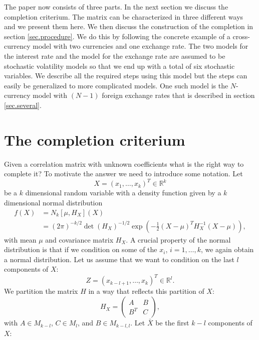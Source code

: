 \documentclass[11pt, a4paper]{article}
\newcommand{\R}{\mathbb{R}}
\begin{document}
The paper now consists of three parts. In the next section we discuss the completion criterium. The matrix can be characterized in three different ways and we present them here. We then discuss the construction of the completion in section \ref{sec.procedure}. We do this by following the concrete example of a cross-currency model with two currencies and one exchange rate. The two models for the interest rate and the model for the exchange rate are assumed to be stochastic volatility models so that we end up with a total of six stochastic variables. We describe all the required steps using this model but the steps can easily be generalized to more complicated models. One such model is the $N$-currency model with $(N-1)$ foreign exchange rates that is described in section \ref{sec.several}. 

\section{The completion criterium}\label{sec.criterium}
Given a correlation matrix with unknown coefficients what is the right way to complete it? To motivate the answer we need to introduce some notation. Let 
\begin{equation}
	X = ( x_1, \ldots, x_k )^T\in \R^k
\end{equation}
be a $k$ dimensional random variable with a density function given by a $k$ dimensional normal distribution
\begin{align}
	f(X) & = N_k[\mu, H_X]( X ) \\
	& = (2\pi)^{-k/2}\det(H_X)^{-1/2}\exp\left(-\frac{1}{2}(X -\mu)^T H_X^{-1} (X-\mu)\right),
\end{align}
with mean $\mu$ and covariance matrix $H_X$. A crucial property of the normal distribution is that if we condition on some of the $x_i$, $i=1, \dots, k$, we again obtain a normal distribution. Let us assume that we want to condition on the last $l$ components of $X$:
\begin{equation}
	Z = (x_{k-l+1}, \ldots, x_k)^T \in \R^l.
\end{equation}
We partition the matrix $H$ in a way that reflects this partition of $X$:
\begin{equation}
	H_X = \begin{pmatrix}
		A & B \\
		B^T & C
	\end{pmatrix},
\end{equation}
with $A\in M_{k-l}$, $C\in M_l$, and $B\in M_{k-l,l}$. Let $\bar X$ be the first $k-l$ components of $X$:
\end{document}
